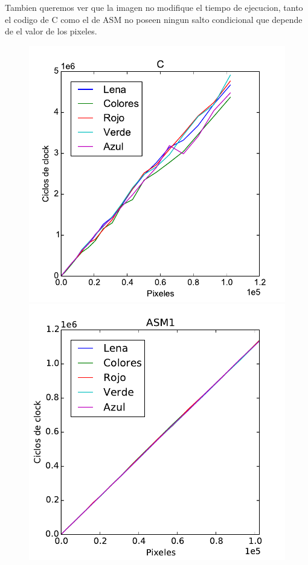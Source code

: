 Tambien queremos ver que la imagen no modifique el tiempo de ejecucion, tanto el codigo de C como el de ASM no poseen ningun salto condicional que depende de el valor de los pixeles.

\begin{figure}[h!]
	\centering
	\includegraphics[scale=0.45]{images/c_merge_lena_colors}
	\includegraphics[scale=0.45]{images/asm1_merge_lena_colors}

\end{figure}
